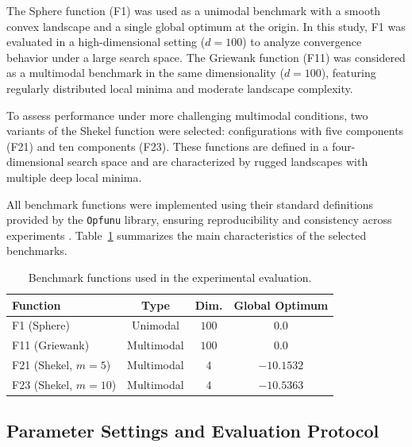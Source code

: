 \documentclass[runningheads]{llncs}
\begin{document}
The Sphere function (F1) was used as a unimodal benchmark with a smooth convex landscape and a single global optimum at the origin. In this study, F1 was evaluated in a high-dimensional setting ($d = 100$) to analyze convergence behavior under a large search space. The Griewank function (F11) was considered as a multimodal benchmark in the same dimensionality ($d = 100$), featuring regularly distributed local minima and moderate landscape complexity.

To assess performance under more challenging multimodal conditions, two variants of the Shekel function were selected: configurations with five components (F21) and ten components (F23). These functions are defined in a four-dimensional search space and are characterized by rugged landscapes with multiple deep local minima.

All benchmark functions were implemented using their standard definitions provided by the \texttt{Opfunu} library, ensuring reproducibility and consistency across experiments \cite{abualigah2021arithmetic,Van_Thieu_2024_Opfunu}. Table~\ref{tab:benchmark_functions} summarizes the main characteristics of the selected benchmarks.

\vspace{-0.25cm}


\begin{table}[H]
    \centering
    \begin{tabular}{lccc}
    \toprule
    Function & Type & Dim. & Global Optimum \\
    \midrule
    F1 (Sphere)        & Unimodal   & $100$ & $0.0$ \\
    F11 (Griewank)     & Multimodal & $100$ & $0.0$ \\
    F21 (Shekel, $m=5$)  & Multimodal & $4$   & $-10.1532$ \\
    F23 (Shekel, $m=10$) & Multimodal & $4$   & $-10.5363$ \\
    \bottomrule
    \end{tabular}
    \caption{Benchmark functions used in the experimental evaluation.}
    \label{tab:benchmark_functions}
\end{table}


\vspace{-1cm}

\subsection{Parameter Settings and Evaluation Protocol}
\label{subsec:protocol}
\end{document}
